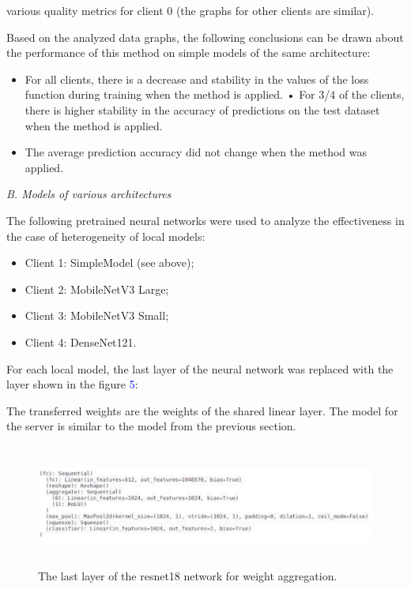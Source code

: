 \documentclass[twotcolumn]{scndocument}
\begin{document}
\begin{multicols}{2}
various quality metrics for client 0 (the graphs for other
clients are similar).
\par Based on the analyzed data graphs, the following
conclusions can be drawn about the performance of this
method on simple models of the same architecture: \begin{itemize}
\item For all clients, there is a decrease and stability in
the values of the loss function during training when
the method is applied.
• For 3/4 of the clients, there is higher stability in the
accuracy of predictions on the test dataset when the
method is applied.
\item The average prediction accuracy did not change
when the method was applied. \end{itemize}
\vspace{2mm} \textit{B. Models of various architectures} \vspace{1mm}
\par The following pretrained neural networks were used to
analyze the effectiveness in the case of heterogeneity of
local models: \begin{itemize}
\item Client 1: SimpleModel (see above);
\item Client 2: MobileNetV3 Large;
\item Client 3: MobileNetV3 Small;
\item Client 4: DenseNet121. \end{itemize}
\par For each local model, the last layer of the neural network was replaced with the layer shown in the figure \textcolor{blue}{5}:
\par The transferred weights are the weights of the shared
linear layer. The model for the server is similar to the
model from the previous section.
\end{multicols}{ }
\begin{figure}[H]
  \centering
    \includegraphics[width=17cm,height=4cm]{image2.png}
  \caption{The last layer of the resnet18 network for weight aggregation.}
\end{figure} 
\end{document}
